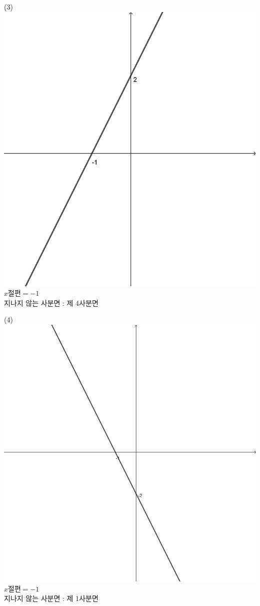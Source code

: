 \documentclass{article}
\begin{document}
\par\bigskip
\noindent
\begin{minipage}{0.3\textwidth}
    \centering
    (3)
    \includegraphics[width=\textwidth]{graph_3.png}\\
    $x\text{절편}=-1$\\
    지나지 않는 사분면 : 제 4사분면
\end{minipage}
\begin{minipage}{0.3\textwidth}
    \centering
    (4)
    \includegraphics[width=\textwidth]{graph_4.png}\\
    $x\text{절편}=-1$\\
    지나지 않는 사분면 : 제 1사분면
\end{minipage}
\end{document}
